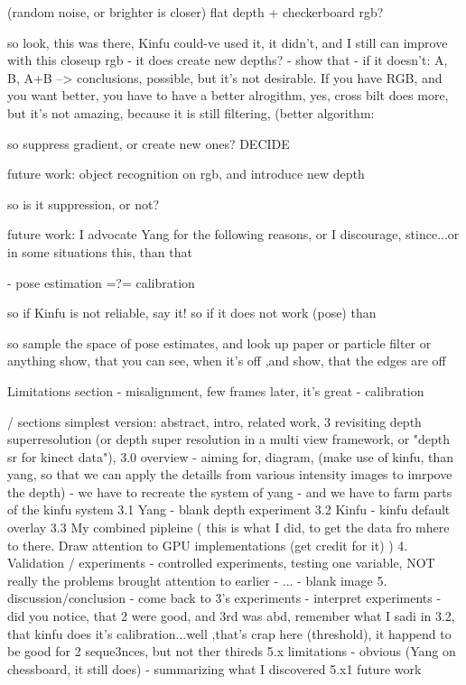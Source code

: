 (random noise, or brighter is closer)
flat depth + checkerboard rgb?

so look, this was there, Kinfu could-ve used it, it didn't, and I still can improve with this closeup rgb
- it does create new depths? - show that
- if it doesn't: A, B, A+B --> conclusions, possible, but it's not desirable. If you have RGB, and you want better, you have to have a better alrogithm, yes, cross bilt does more, but it's not amazing, because it is still filtering, (better algorithm: 

so suppress gradient, or create new ones? DECIDE

future work: object recognition on rgb, and introduce new depth

so is it suppression, or not?

future work: I advocate Yang for the following reasons, or I discourage, stince...or in some situations this, than that

- pose estimation =?= calibration

so if Kinfu is not reliable, say it! so if it does not work (pose) than 

so sample the space of pose estimates, and look up paper
    or particle filter
    or anything
    show, that you can see, when it's off ,and show, that the edges are off
    
Limitations section
    - misalignment, few frames later, it's great
    - calibration
    
    
    
/ sections
simplest version: abstract, intro, related work, 
3 revisiting depth superresolution (or depth super resolution in a multi view framework, or "depth sr for kinect data"), 
3.0 overview - aiming for, diagram, (make use of kinfu, than yang, so that we can apply the detaills from various intensity images to imrpove the depth)
    - we have to recreate the system of yang
    - and we have to farm parts of the kinfu system
3.1 Yang
    - blank depth experiment
3.2 Kinfu
    - kinfu default overlay
3.3 My combined pipleine ( this is what I did, to get the data fro mhere to there. Draw attention to GPU implementations (get credit for it) )
4. Validation / experiments
    - controlled experiments, testing one variable, NOT really the problems brought attention to earlier
    - ...
    - blank image
5. discussion/conclusion
    - come back to 3's experiments
    - interpret experiments
    - did you notice, that 2 were good, and 3rd was abd, remember what I sadi in 3.2, that kinfu does it's calibration...well ,that's crap here (threshold), it happend to be good for 2 seque3nces, but not ther thireds
    5.x limitations
        - obvious (Yang on chessboard, it still does)
        - summarizing what I discovered
    5.x1 future work
        
